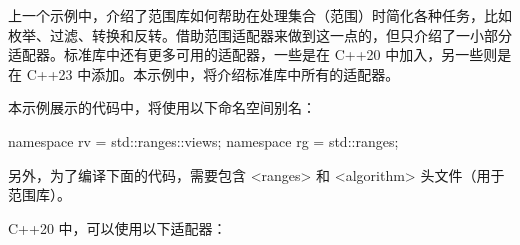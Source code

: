 

上一个示例中，介绍了范围库如何帮助在处理集合（范围）时简化各种任务，比如枚举、过滤、转换和反转。借助范围适配器来做到这一点的，但只介绍了一小部分适配器。标准库中还有更多可用的适配器，一些是在 C++20 中加入，另一些则是在 C++23 中添加。本示例中，将介绍标准库中所有的适配器。



本示例展示的代码中，将使用以下命名空间别名：

\begin{cpp}
namespace rv = std::ranges::views;
namespace rg = std::ranges;
\end{cpp}

另外，为了编译下面的代码，需要包含 <ranges> 和 <algorithm> 头文件（用于范围库）。


C++20 中，可以使用以下适配器：

